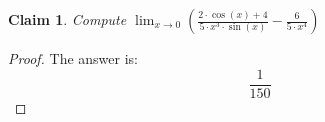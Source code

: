 \documentclass{article}
\newtheorem{theorem}{Claim}
\begin{document}
\begin{theorem}
Compute $\lim_{x \to 0}\left(\frac{ 2 \cdot \cos(x)+4 }{ 5 \cdot x^3 \cdot \sin(x) }-\frac{ 6 }{ 5 \cdot x^4 }\right)$
\end{theorem}

\begin{proof}
The answer is:
\[
\frac{1}{150}
\]
\end{proof}
\end{document}
